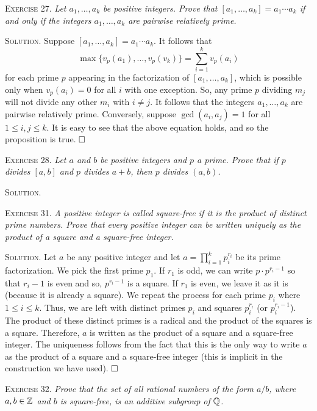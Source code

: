 \documentclass[11pt, leqno]{article}
\newcommand{\done}{\ensuremath{\hfill\square}}
\begin{document}
\textsc{Exercise 27}. \emph{Let $a_1, \ldots, a_k$ be positive integers. Prove that $[a_1, \ldots, a_k] = a_1\cdots a_k$ if and only if the integers $a_1, \ldots, a_k$ are pairwise relatively prime.}

\textsc{Solution}. Suppose $[a_1, \ldots, a_k] = a_1\cdots a_k$. It follows that 
\begin{displaymath}
\max\{ v_p(a_1), \ldots, v_p(v_k) \} = \sum_{i=1}^k v_p(a_i)
\end{displaymath}
for each prime $p$ appearing in the factorization of $[a_1, \ldots, a_k]$, which is possible only when $v_p(a_i) = 0$ for all $i$ with one exception. So, any prime $p$ dividing $m_j$ will not divide any other $m_i$ with $i \ne j$. It follows that the integers $a_1, \ldots, a_k$ are pairwise relatively prime. Conversely, suppose $\gcd(a_i, a_j) = 1$ for all $1 \leq i, j \leq k$. It is easy to see that the above equation holds, and so the proposition is true. \done

\textsc{Exercise 28}. \emph{Let $a$ and $b$ be positive integers and $p$ a prime. Prove that if $p$ divides $[a,b]$ and $p$ divides $a+b$, then $p$ divides $(a,b)$.}

\textsc{Solution}.

\textsc{Exercise 31}. \emph{A positive integer is called square-free if it is the product of distinct prime numbers. Prove that every positive integer can be written uniquely as the product of a square and a square-free integer.}

\textsc{Solution}. Let $a$ be any positive integer and let $a = \prod_{i=1}^k p_i^{r_i}$ be its prime factorization. We pick the first prime $p_1$. If $r_1$ is odd, we can write $p\cdot p^{r_i - 1}$ so that $r_i-1$ is even and so, $p^{r_i-1}$ is a square. If $r_1$ is even, we leave it as it is (because it is already a square). We repeat the process for each prime $p_i$ where $1 \leq i \leq k$. Thus, we are left with distinct primes $p_i$ and squares $p_i^{r_i}$ (or $p_i^{r_i-1}$). The product of these distinct primes is a radical and the product of the squares is a square. Therefore, $a$ is written as the product of a square and a square-free integer. The uniqueness follows from the fact that this is the only way to write $a$ as the product of a square and a square-free integer (this is implicit in the construction we have used). \done

\textsc{Exercise 32}. \emph{Prove that the set of all rational numbers of the form $a/b$, where $a, b \in \mathbb{Z}$ and $b$ is square-free, is an additive subgroup of $\mathbb{Q}$.}
\end{document}
